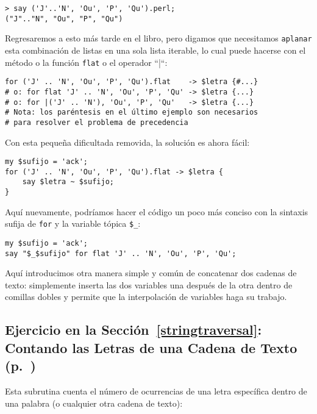 \begin{verbatim}
> say ('J'..'N', 'Ou', 'P', 'Qu').perl;
("J".."N", "Ou", "P", "Qu")
\end{verbatim}
%

Regresaremos a esto más tarde en el libro, pero digamos que
necesitamos {\tt aplanar} esta combinación de listas en una
sola lista iterable, lo cual puede hacerse con el método o la
función {\tt flat} o el operador ``|``:

\begin{verbatim}
for ('J' .. 'N', 'Ou', 'P', 'Qu').flat    -> $letra {#...}
# o: for flat 'J' .. 'N', 'Ou', 'P', 'Qu' -> $letra {...}
# o: for |('J' .. 'N'), 'Ou', 'P', 'Qu'   -> $letra {...}
# Nota: los paréntesis en el último ejemplo son necesarios
# para resolver el problema de precedencia
\end{verbatim}
%

Con esta pequeña dificultada removida, la solución es ahora fácil:

\begin{verbatim}
my $sufijo = 'ack';
for ('J' .. 'N', 'Ou', 'P', 'Qu').flat -> $letra {
    say $letra ~ $sufijo;
}
\end{verbatim}
%

Aquí nuevamente, podríamos hacer el código un poco más conciso 
con la sintaxis sufija de {\tt for} y la variable tópica \verb|$_|:

\begin{verbatim}
my $sufijo = 'ack';
say "$_$sufijo" for flat 'J' .. 'N', 'Ou', 'P', 'Qu';
\end{verbatim}
%

Aquí introducimos otra manera simple y común de concatenar
dos cadenas de texto: simplemente inserta las dos variables
una después de la otra dentro de comillas dobles y permite
que la interpolación de variables haga su trabajo.


\subsection{Ejercicio en la Sección~\ref{stringtraversal}: Contando las Letras de una Cadena de Texto (p.~\pageref{stringtraversal})}
\label{sol_count_letters}

Esta subrutina cuenta el número de ocurrencias de una letra específica
dentro de una palabra (o cualquier otra cadena de texto):

